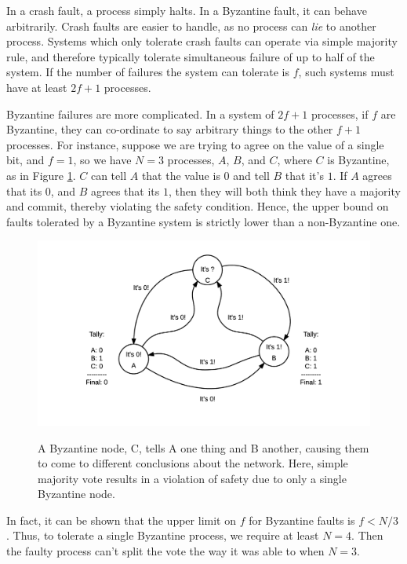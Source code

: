 In a crash fault, a process simply halts. In a Byzantine fault, it can behave arbitrarily.
Crash faults are easier to handle, as no process can \emph{lie} to another process.
Systems which only tolerate crash faults can operate via simple majority rule, 
and therefore typically tolerate simultaneous failure of up to half of the system.
If the number of failures the system can tolerate is $f$, such systems must have at least $2f+1$ processes.

Byzantine failures are more complicated. In a system of $2f+1$ processes, if $f$ are Byzantine, 
they can co-ordinate to say arbitrary things to the other $f+1$ processes.
For instance, suppose we are trying to agree on the value of a single bit, 
and $f=1$, so we have $N=3$ processes, $A$, $B$, and $C$, where $C$ is Byzantine, as in Figure \ref{fig:byzantine}.
$C$ can tell $A$ that the value is $0$ and tell $B$ that it's $1$. 
If $A$ agrees that its $0$, and $B$ agrees that its $1$, then they will both think they have a majority and commit, 
thereby violating the safety condition.
Hence, the upper bound on faults tolerated by a Byzantine system is strictly lower than a non-Byzantine one.

\begin{figure}[]
	\includegraphics[width=\linewidth,height=\textheight,keepaspectratio]{figures/diagrams/byzantine.png}
    	\centering
	\label{fig:byzantine}
	\caption[Byzantine nodes tell lies]{
A Byzantine node, C, tells A one thing and B another, causing them to come to different conclusions about the network.
Here, simple majority vote results in a violation of safety due to only a single Byzantine node.}
\end{figure}


In fact, it can be shown that the upper limit on $f$ for Byzantine faults is $f < N/3$ \cite{pease1980reaching}.
Thus, to tolerate a single Byzantine process, we require at least $N=4$. 
Then the faulty process can't split the vote the way it was able to when $N=3$.

